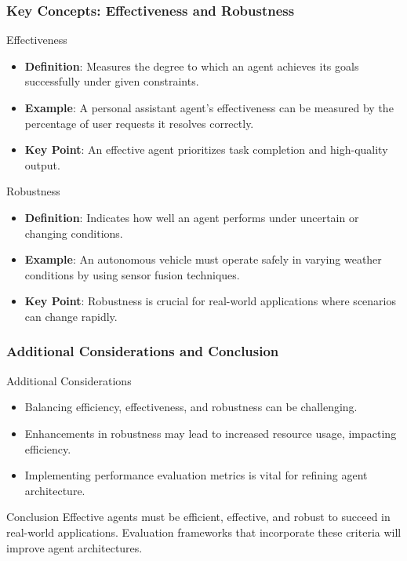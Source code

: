 \documentclass[aspectratio=169]{beamer}
\begin{document}
\begin{frame}[fragile]
    \frametitle{Key Concepts: Effectiveness and Robustness}
    \begin{block}{Effectiveness}
        \begin{itemize}
            \item \textbf{Definition}: Measures the degree to which an agent achieves its goals successfully under given constraints.
            \item \textbf{Example}: A personal assistant agent's effectiveness can be measured by the percentage of user requests it resolves correctly.
            \item \textbf{Key Point}: An effective agent prioritizes task completion and high-quality output.
        \end{itemize}
    \end{block}

    \begin{block}{Robustness}
        \begin{itemize}
            \item \textbf{Definition}: Indicates how well an agent performs under uncertain or changing conditions.
            \item \textbf{Example}: An autonomous vehicle must operate safely in varying weather conditions by using sensor fusion techniques.
            \item \textbf{Key Point}: Robustness is crucial for real-world applications where scenarios can change rapidly.
        \end{itemize}
    \end{block}
\end{frame}

\begin{frame}[fragile]
    \frametitle{Additional Considerations and Conclusion}
    \begin{block}{Additional Considerations}
        \begin{itemize}
            \item Balancing efficiency, effectiveness, and robustness can be challenging.
            \item Enhancements in robustness may lead to increased resource usage, impacting efficiency.
            \item Implementing performance evaluation metrics is vital for refining agent architecture.
        \end{itemize}
    \end{block}

    \begin{block}{Conclusion}
        Effective agents must be efficient, effective, and robust to succeed in real-world applications. Evaluation frameworks that incorporate these criteria will improve agent architectures.
    \end{block}
\end{frame}
\end{document}
